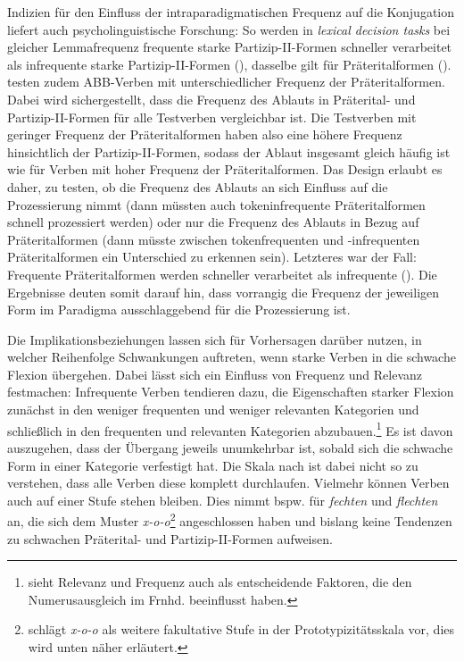 Indizien für den Einfluss der intraparadigmatischen Frequenz auf die Konjugation liefert auch psycholinguistische Forschung: So werden in \textit{lexical de\-ci\-sion tasks} bei gleicher Lemmafrequenz frequente starke Partizip-II-Formen  schneller verarbeitet als infrequente starke Partizip-II-Formen (\cite[227--231]{Clahsen.1997}), dasselbe gilt für Prä\-teri\-talformen (\cite[527--528]{Clahsen.2001}). \textcite[528--530]{Clahsen.2001} testen zudem ABB-Verben mit unterschiedlicher Frequenz der Präteritalformen. Dabei wird sichergestellt, dass die Frequenz des Ablauts in Präterital- und Partizip-II-Formen für alle Testverben vergleichbar ist. Die Testverben mit geringer Frequenz der Präteritalformen haben also eine höhere Frequenz hinsichtlich der Partizip-II-Formen, sodass der Ablaut insgesamt gleich häufig ist wie für Verben mit hoher Frequenz der Präteritalformen. Das Design erlaubt es daher, zu testen, ob die Frequenz des Ablauts an sich Einfluss auf die Prozessierung nimmt (dann müssten auch tokeninfrequente Präteritalformen schnell prozessiert werden) oder nur die Frequenz des Ablauts in Bezug auf Präteritalformen (dann müsste zwischen tokenfrequenten und -infrequenten Präteritalformen ein Unterschied zu erkennen sein). Letzteres war der Fall: Frequente Präteritalformen werden schneller verarbeitet als infrequente (\cite[530]{Clahsen.2001}). Die Ergebnisse deuten somit darauf hin, dass vorrangig die Frequenz der jeweiligen Form im Paradigma ausschlaggebend für die Prozessierung ist. 

Die Implikationsbeziehungen lassen sich für Vorhersagen darüber nutzen, in welcher Reihenfolge Schwankungen auftreten, wenn starke Verben in die schwache Flexion übergehen. Dabei lässt sich ein Einfluss von Frequenz und Relevanz festmachen: Infrequente Verben tendieren dazu, die Eigenschaften starker Flexion zunächst in den weniger frequenten und weniger relevanten Kategorien und schließlich in den frequenten und relevanten Kategorien abzubauen.\footnote{\textcite[197--200]{Nubling.1998} sieht Relevanz und Frequenz auch als entscheidende Faktoren, die den Numerusausgleich im Frnhd. beeinflusst haben.} Es ist davon auszugehen, dass der Übergang jeweils unumkehrbar ist, sobald sich die schwache Form in einer Kategorie verfestigt hat. Die Skala nach \textcite[80]{Bittner.1996} ist dabei nicht so zu verstehen, dass alle Verben diese komplett durchlaufen. Vielmehr können Verben auch auf einer Stufe stehen bleiben. Dies nimmt \textcite[182--183]{Nowak.2013} bspw. für \textit{fechten} und \textit{flechten} an, die sich dem Muster \textit{x-o-o}\footnote{\textcite[182--183]{Nowak.2013} schlägt \textit{x-o-o} als weitere fakultative Stufe in der Prototypizitätsskala vor, dies wird unten näher erläutert.} angeschlossen haben und bislang keine Tendenzen zu schwachen Präterital- und Partizip-II-Formen aufweisen.


